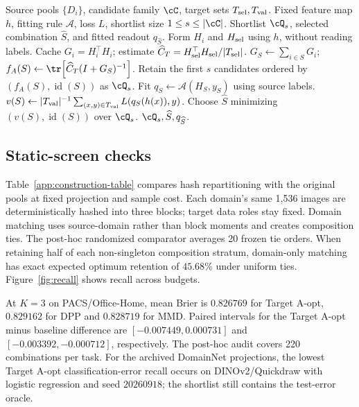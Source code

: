\begin{algorithm}[htbp]
\caption{Target A-opt screening and validation}
\label{alg:target-a}
\begin{algorithmic}[1]
\Require Source pools $\{D_i\}$, candidate family $\cC$, target sets $T_{\rm sel},T_{\rm val}$.
\Require Fixed feature map $h$, fitting rule $\mathcal A$, loss $L$, shortlist size $1\leq s\leq|\cC|$.
\Ensure Shortlist $\cQ_s$, selected combination $\widehat S$, and fitted readout $q_{\widehat S}$.
\State Form $H_i$ and $H_{\rm sel}$ using $h$, without reading labels.
\State Cache $G_i=H_i^\top H_i$; estimate $\widehat C_T=H_{\rm sel}^\top H_{\rm sel}/|T_{\rm sel}|$.
  \State $G_S\gets\sum_{i\in S}G_i$; $f_A(S)\gets\tr\!\left[\widehat C_T(I+G_S)^{-1}\right]$.
\EndFor
\State Retain the first $s$ candidates ordered by $(f_A(S),\operatorname{id}(S))$ as $\cQ_s$.
  \State Fit $q_S\gets\mathcal A(H_S,y_S)$ using source labels.
  \State $v(S)\gets |T_{\rm val}|^{-1}\sum_{(x,y)\in T_{\rm val}}L(q_S(h(x)),y)$.
\EndFor
\State Choose $\widehat S$ minimizing $(v(S),\operatorname{id}(S))$ over $\cQ_s$.
\State \Return $\cQ_s,\widehat S,q_{\widehat S}$.
\end{algorithmic}
\end{algorithm}

\subsection{Static-screen checks}
\label{app:diagnostics}
Table~\ref{app:construction-table} compares hash repartitioning with the original pools at fixed projection and sample cost. Each domain's same 1,536 images are deterministically hashed into three blocks; target data roles stay fixed. Domain matching uses source-domain rather than block moments and creates composition ties. The post-hoc randomized comparator averages 20 frozen tie orders. When retaining half of each non-singleton composition stratum, domain-only matching has exact expected optimum retention of $45.68\%$ under uniform ties. Figure~\ref{fig:recall} shows recall across budgets.

At $K=3$ on PACS/Office-Home, mean Brier is $0.826769$ for Target A-opt, $0.829162$ for DPP and $0.828719$ for MMD. Paired intervals for the Target A-opt minus baseline difference are $[-0.007449,0.000731]$ and $[-0.003392,-0.000712]$, respectively. The post-hoc audit covers 220 combinations per task. For the archived DomainNet projections, the lowest Target A-opt classification-error recall occurs on DINOv2/Quickdraw with logistic regression and seed $20260918$; the shortlist still contains the test-error oracle.

